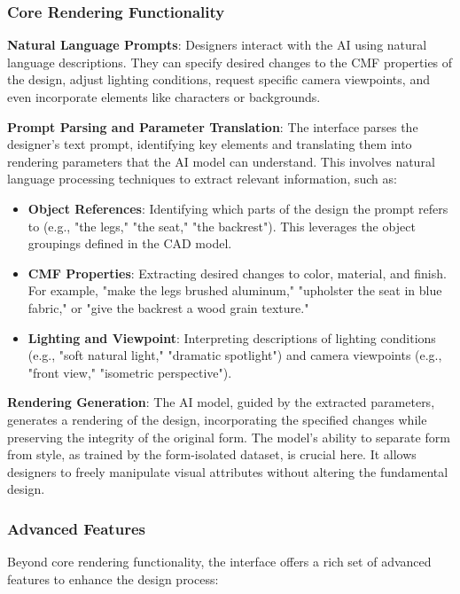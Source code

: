 \subsubsection{Core Rendering Functionality}

\textbf{Natural Language Prompts}: Designers interact with the AI using natural language descriptions. They can specify desired changes to the CMF properties of the design, adjust lighting conditions, request specific camera viewpoints, and even incorporate elements like characters or backgrounds.

\textbf{Prompt Parsing and Parameter Translation}: The interface parses the designer's text prompt, identifying key elements and translating them into rendering parameters that the AI model can understand. This involves natural language processing techniques to extract relevant information, such as:

\begin{itemize}
\item \textbf{Object References}: Identifying which parts of the design the prompt refers to (e.g., "the legs," "the seat," "the backrest"). This leverages the object groupings defined in the CAD model.
\item \textbf{CMF Properties}: Extracting desired changes to color, material, and finish. For example, "make the legs brushed aluminum," "upholster the seat in blue fabric," or "give the backrest a wood grain texture."
\item \textbf{Lighting and Viewpoint}: Interpreting descriptions of lighting conditions (e.g., "soft natural light," "dramatic spotlight") and camera viewpoints (e.g., "front view," "isometric perspective").
\end{itemize}

\textbf{Rendering Generation}: The AI model, guided by the extracted parameters, generates a rendering of the design, incorporating the specified changes while preserving the integrity of the original form. The model's ability to separate form from style, as trained by the form-isolated dataset, is crucial here. It allows designers to freely manipulate visual attributes without altering the fundamental design.

\subsubsection{Advanced Features}

Beyond core rendering functionality, the interface offers a rich set of advanced features to enhance the design process:

